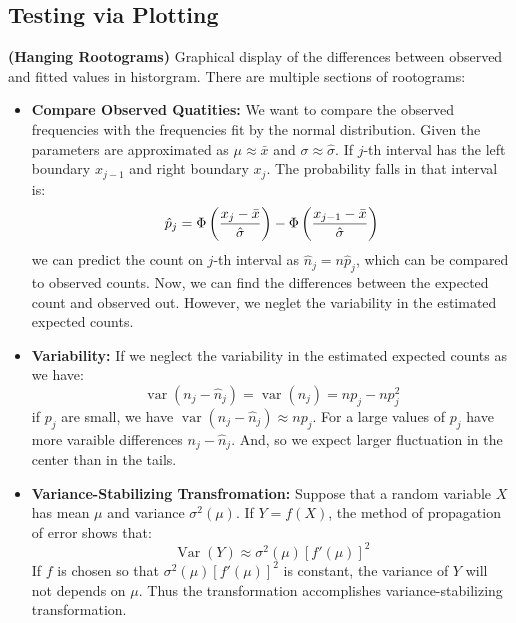 \subsection{Testing via Plotting}

\begin{definition}{\textbf{(Hanging Rootograms)}}
    Graphical display of the differences between observed and fitted values in historgram. There are multiple sections of rootograms:
    \begin{itemize}
        \item \textbf{Compare Observed Quatities:} We want to compare the observed frequencies with the frequencies fit by the normal distribution. Given the parameters are approximated as $\mu \approx \bar{x}$ and $\sigma \approx \hat{\sigma}$. If $j$-th interval has the left boundary $x_{j-1}$ and right boundary $x_j$. The probability falls in that interval is:
        \begin{equation*}
            \hat{p}_j = \Phi\left( \frac{x_j - \bar{x}}{\hat{\sigma}} \right) - \Phi\left( \frac{x_{j-1} - \bar{x}}{\hat{\sigma}} \right)
        \end{equation*}
        we can predict the count on $j$-th interval as $\hat{n}_j = n\hat{p}_j$, which can be compared to observed counts. Now, we can find the differences between the expected count and observed out. However, we neglet the variability in the estimated expected counts.
        \item \textbf{Variability:} If we neglect the variability in the estimated expected counts as we have:
        \begin{equation*}
            \operatorname{var}(n_j - \hat{n}_j) = \operatorname{var}(n_j) = np_j - np_j^2
        \end{equation*}
        if $p_j$ are small, we have $\operatorname{var}(n_j - \hat{n}_j) \approx np_j$. For a large values of $p_j$ have more varaible differences $n_j - \hat{n}_j$. And, so we expect larger fluctuation in the center than in the tails. 
        \item \textbf{Variance-Stabilizing Transfromation:} Suppose that a random variable $X$ has mean $\mu$ and variance $\sigma^2(\mu)$. If $Y = f(X)$, the method of propagation of error shows that:
        \begin{equation*}
            \operatorname{Var}(Y) \approx \sigma^2(\mu)[f'(\mu)]^2
        \end{equation*}
        If $f$ is chosen so that $\sigma^2(\mu)[f'(\mu)]^2$ is constant, the variance of $Y$ will not depends on $\mu$. Thus the transformation accomplishes variance-stabilizing transformation. 

\end{itemize}
\end{definition}
